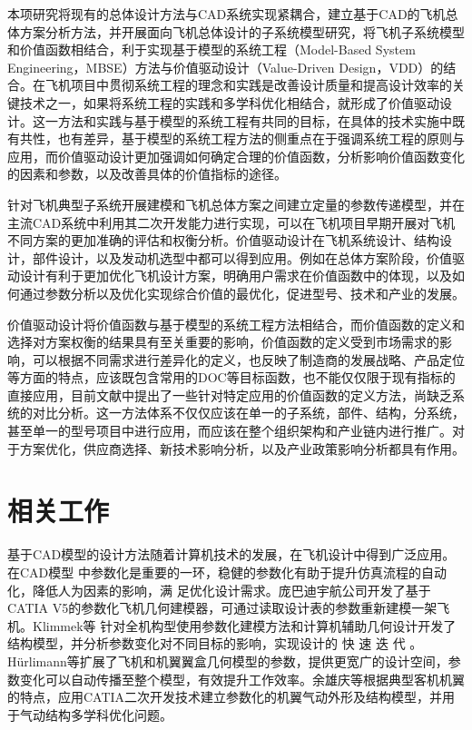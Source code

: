 \documentclass[12pt,a4paper]{report}
\begin{document}
本项研究将现有的总体设计方法与CAD系统实现紧耦合，建立基于CAD的飞机总体方案分析方法，并开展面向飞机总体设计的子系统模型研究，将飞机子系统模型和价值函数相结合，利于实现基于模型的系统工程（Model-Based System Engineering，MBSE）方法与价值驱动设计（Value-Driven Design，VDD）的结合。在飞机项目中贯彻系统工程的理念和实践是改善设计质量和提高设计效率的关键技术之一，如果将系统工程的实践和多学科优化相结合，就形成了价值驱动设计。这一方法和实践与基于模型的系统工程有共同的目标，在具体的技术实施中既有共性，也有差异，基于模型的系统工程方法的侧重点在于强调系统工程的原则与应用，而价值驱动设计更加强调如何确定合理的价值函数，分析影响价值函数变化的因素和参数，以及改善具体的价值指标的途径。

针对飞机典型子系统开展建模和飞机总体方案之间建立定量的参数传递模型，并在主流CAD系统中利用其二次开发能力进行实现，可以在飞机项目早期开展对飞机不同方案的更加准确的评估和权衡分析。价值驱动设计在飞机系统设计、结构设计，部件设计，以及发动机选型中都可以得到应用。例如在总体方案阶段，价值驱动设计有利于更加优化飞机设计方案，明确用户需求在价值函数中的体现，以及如何通过参数分析以及优化实现综合价值的最优化，促进型号、技术和产业的发展。

价值驱动设计将价值函数与基于模型的系统工程方法相结合，而价值函数的定义和选择对方案权衡的结果具有至关重要的影响，价值函数的定义受到市场需求的影响，可以根据不同需求进行差异化的定义，也反映了制造商的发展战略、产品定位等方面的特点，应该既包含常用的DOC等目标函数，也不能仅仅限于现有指标的直接应用，目前文献中提出了一些针对特定应用的价值函数的定义方法，尚缺乏系统的对比分析。这一方法体系不仅仅应该在单一的子系统，部件、结构，分系统，甚至单一的型号项目中进行应用，而应该在整个组织架构和产业链内进行推广。对于方案优化，供应商选择、新技术影响分析，以及产业政策影响分析都具有作用。


\section{相关工作}
基于CAD模型的设计方法随着计算机技术的发展，在飞机设计中得到广泛应用。在CAD模型 中参数化是重要的一环，稳健的参数化有助于提升仿真流程的自动化，降低人为因素的影响，满 足优化设计需求。庞巴迪宇航公司\cite{TARKIAN2008aircraft}开发了基于 CATIA V5的参数化飞机几何建模器，可通过读取设计表的参数重新建模一架飞机。Klimmek等\cite{KLIMMEK2014parametric} 针对全机构型使用参数化建模方法和计算机辅助几何设计开发了结构模型，并分析参数变化对不同目标的影响，实现设计的 快 速 迭 代 。
Hürlimann等\cite{HÜRLIMANN2011mass}扩展了飞机和机翼翼盒几何模型的参数，提供更宽广的设计空间，参数变化可以自动传播至整个模型，有效提升工作效率。余雄庆等\cite{Hujie2012aircraft}根据典型客机机翼的特点，应用CATIA二次开发技术建立参数化的机翼气动外形及结构模型，并用于气动结构多学科优化问题。
\end{document}
